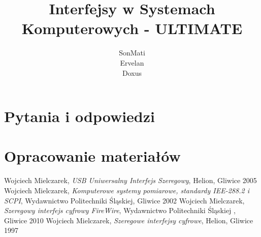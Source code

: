 \documentclass[a4paper,twoside]{article}
\begin{document}




\begin{titlepage}
\title{\huge Interfejsy w Systemach Komputerowych - ULTIMATE}
\author{\large SonMati \\ Ervelan \\ Doxus}
\maketitle
\end{titlepage}

\part{Pytania i odpowiedzi}
	

\part{Opracowanie materiałów}




	






\begin{thebibliography}{3}
	 Wojciech Mielczarek, \textit{USB Uniwersalny Interfejs Szeregowy}, Helion, Gliwice 2005
	 Wojciech Mielczarek, \textit{Komputerowe systemy pomiarowe, standardy IEE-288.2 i SCPI}, Wydawnictwo Politechniki Śląskiej, Gliwice 2002
	 Wojciech Mielczarek, \textit{Szeregowy interfejs cyfrowy FireWire}, Wydawnictwo Politechniki Śląskiej , Gliwice 2010
	 Wojciech Mielczarek, \textit{Szeregowe interfejsy cyfrowe}, Helion, Gliwice 1997
\end{thebibliography}
\end{document}
